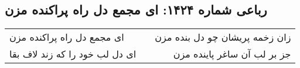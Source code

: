 \begin{center}
\section*{رباعی شماره ۱۴۲۴: ای مجمع دل راه پراکنده مزن}
\label{sec:1424}
\begin{longtable}{l p{0.5cm} r}
ای مجمع دل راه پراکنده مزن
&&
زان زخمه پریشان چو دل بنده مزن
\\
ای دل لب خود را که زند لاف بقا
&&
جز بر لب آن ساغر پاینده مزن
\\
\end{longtable}
\end{center}
